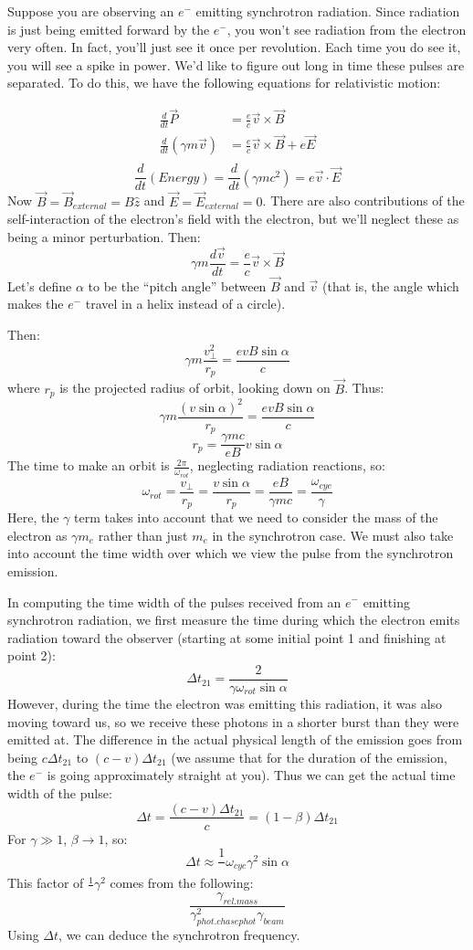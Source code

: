 \documentclass{article}
\def\inv#1{\frac1{#1}}
\def\inv#1{{\frac{1}{}#1}}
\def\ddt{{\frac{d}{dt}}}
\def\^{\hat }
\begin{document}
Suppose you are observing an $e^-$ emitting synchrotron radiation.  Since
radiation is just being emitted forward by the $e^-$, you won't see radiation
from the electron very often.  In fact, you'll just see it once per revolution.
Each time you do see it, you will see a spike in power.  We'd like to figure
out long in time these pulses are separated.  To do this, we have the 
following equations for relativistic motion:

$$\begin{aligned}\ddt\vec P&=\frac{e}{ c}\vec v\times\vec B\\ 
\ddt(\gamma m\vec v)&=\frac{e}{ c}\vec v\times\vec B+e\vec E\\ \end{aligned}$$
$$\ddt(Energy)=\ddt(\gamma mc^2)=e\vec v\cdot\vec E$$
Now $\vec B=\vec B_{external}=B\^z$ and $\vec E=\vec E_{external}=0$.  There
are also contributions of the self-interaction of the electron's field with
the electron, but we'll neglect these as being a minor perturbation.  Then:
$$\boxed{\gamma m\frac{d\vec v}{ dt}=\frac{e}{ c}\vec v\times\vec B}$$
Let's define $\alpha$ to be the ``pitch angle'' between $\vec B$ and $\vec v$
(that is, the angle which makes the $e^-$ travel in a helix instead of a 
circle).

Then:
$$\gamma m\frac{v_\perp^2}{ r_p}=\frac{evB\sin\alpha}{ c}$$
where $r_p$ is the projected radius of orbit, looking down on $\vec B$. Thus:
$$\gamma m\frac{(v\sin\alpha)^2}{ r_p}=\frac{evB\sin\alpha}{ c}$$
$$r_p=\frac{\gamma mc}{ eB}v\sin\alpha$$
The time to make an orbit is $\frac{2\pi}{\omega_{rot}}$, neglecting radiation
reactions, so:
$$\omega_{rot}=\frac{v_\perp}{ r_p}=\frac{v\sin\alpha}{ r_p}=\frac{eB}{\gamma mc}
=\frac{\omega_{cyc}}{\gamma}$$
Here, the $\gamma$ term takes into account that we need to consider the mass of the electron as $\gamma m_e$ rather than just $m_e$ in the synchrotron case. We must also take into account the time width over which we view the pulse from the synchrotron emission.

In computing the time width of the pulses received from an $e^-$ emitting 
synchrotron radiation, we first measure the time during which the 
electron emits radiation toward the observer (starting at some initial
point 1 and finishing at point 2):
$$\Delta t_{21}=\frac{2}{\gamma\omega_{rot}\sin\alpha}$$
However, during the time the electron was emitting this radiation, it was
also moving toward us, so we receive these photons in a shorter burst than
they were emitted at.  The difference in the actual physical length of
\def\tto{{t_{21}}}
the emission goes from being $c\Delta\tto$ to $(c-v)\Delta\tto$ (we assume
that for the duration of the emission, the $e^-$ is going approximately
straight at you).  Thus we can get the actual time width of the pulse:
$$\Delta t=\frac{(c-v)\Delta\tto}{ c}=(1-\beta)\Delta\tto$$
For $\gamma\gg1$, $\beta\to1$, so:
$$\Delta t\approx\inv{\omega_{cyc}\gamma^2\sin\alpha}$$
This factor of $\inv{\gamma^2}$ comes from the following:
$$\frac{\gamma_{rel. mass}}{
\gamma_{{phot. chase} phot}^2\gamma_{beam}}$$
Using $\Delta t$, we can deduce the synchrotron frequency.  
\end{document}
